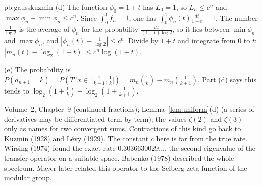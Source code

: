 \begin{solution}{pb:gausskuzmin}
(d) The function $\phi_0=1+t$ has $L_0=1$, so $L_n\le c^n$ and $\max\phi_n-\min\phi_n\le c^n$. Since $\int_0^1f_n=1$, one has $\int_0^1\phi_n(t)\frac{dt}{1+t}=1$. The number $\frac1{\log2}$ is the average of $\phi_n$ for the probability $\frac{dt}{(1+t)\log2}$, so it lies between $\min\phi_n$ and $\max\phi_n$, and $|\phi_n(t)-\frac1{\log2}|\le c^n$. Divide by $1+t$ and integrate from $0$ to $t$: $|m_n(t)-\log_2(1+t)|\le c^n\log(1+t)$.

(e) The probability is $P(a_{n+1}=k)=P(T^nx\in\,]\frac1{k+1},\frac1k])=m_n(\frac1k)-m_n(\frac1{k+1})$. Part (d) says this tends to $\log_2(1+\frac1k)-\log_2(1+\frac1{k+1})$.

\tools Volume~2, Chapter~9 (continued fractions); Lemma~\ref{lem:uniform}(d) (a series of derivatives may be differentiated term by term); the values $\zeta(2)$ and $\zeta(3)$ only as names for two convergent sums.
\leads Contractions of this kind go back to Kuzmin (1928) and L\'evy (1929). The constant $c$ here is far from the true rate. Wirsing (1974) found the exact rate $0.3036630029\ldots$, the second eigenvalue of the transfer operator on a suitable space. Babenko (1978) described the whole spectrum. Mayer later related this operator to the Selberg zeta function of the modular group.
\end{solution}

